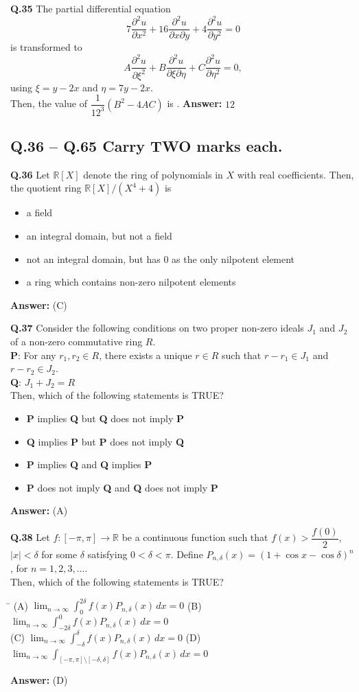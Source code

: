 \documentclass[11pt,a4paper]{article}
\newcommand{\optsfourA}[4]{%
  \begin{tabbing}
    \hspace{0.48\linewidth}\=\kill
    (A) #1 \> (B) #2 \\[2pt]
    (C) #3 \> (D) #4
  \end{tabbing}%
}
\newcommand{\optslistA}[4]{%
  \begin{itemize}
    \setlength{\itemsep}{2pt}\setlength{\parskip}{0pt}
    \item[(A)] #1
    \item[(B)] #2
    \item[(C)] #3
    \item[(D)] #4
  \end{itemize}%
}
\newcommand{\ans}[1]{\textbf{Answer:} #1\par\medskip}
\begin{document}
\textbf{Q.35} The partial differential equation
\[
  7\frac{\partial^2 u}{\partial x^2} + 16\frac{\partial^2 u}{\partial x \partial y} + 4\frac{\partial^2 u}{\partial y^2} = 0
\]
is transformed to
\[
  A\frac{\partial^2 u}{\partial \xi^2} + B\frac{\partial^2 u}{\partial \xi \partial \eta} + C\frac{\partial^2 u}{\partial \eta^2} = 0,
\]
using $\xi = y - 2x$ and $\eta = 7y - 2x$.\\
Then, the value of $\dfrac{1}{12^3}(B^2 - 4AC)$ is \underline{\hspace{2cm}}.
\ans{$12$}

\subsection*{Q.36 -- Q.65 Carry TWO marks each.}

\textbf{Q.36} Let $\mathbb{R}[X]$ denote the ring of polynomials in $X$ with real coefficients. Then, the quotient ring $\mathbb{R}[X] / (X^4 + 4)$ is
\optslistA{a field}{an integral domain, but not a field}{not an integral domain, but has $0$ as the only nilpotent element}{a ring which contains non-zero nilpotent elements}
\ans{(C)}

\textbf{Q.37} Consider the following conditions on two proper non-zero ideals $J_1$ and $J_2$ of a non-zero commutative ring $R$.\\
\textbf{P}: For any $r_1, r_2 \in R$, there exists a unique $r \in R$ such that $r - r_1 \in J_1$ and $r - r_2 \in J_2$.\\
\textbf{Q}: $J_1 + J_2 = R$\\
Then, which of the following statements is TRUE?
\optslistA{\textbf{P} implies \textbf{Q} but \textbf{Q} does not imply \textbf{P}}{\textbf{Q} implies \textbf{P} but \textbf{P} does not imply \textbf{Q}}{\textbf{P} implies \textbf{Q} and \textbf{Q} implies \textbf{P}}{\textbf{P} does not imply \textbf{Q} and \textbf{Q} does not imply \textbf{P}}
\ans{(A)}

\textbf{Q.38} Let $f : [-\pi, \pi] \to \mathbb{R}$ be a continuous function such that $f(x) > \dfrac{f(0)}{2}$, $|x| < \delta$ for some $\delta$ satisfying $0 < \delta < \pi$. Define $P_{n,\delta}(x) = (1 + \cos x - \cos\delta)^n$, for $n = 1, 2, 3, \dots$.\\
Then, which of the following statements is TRUE?
\optsfourA{$\displaystyle\lim_{n\to\infty} \int_0^{2\delta} f(x) P_{n,\delta}(x)\,dx = 0$}{$\displaystyle\lim_{n\to\infty} \int_{-2\delta}^{0} f(x) P_{n,\delta}(x)\,dx = 0$}{$\displaystyle\lim_{n\to\infty} \int_{-\delta}^{\delta} f(x) P_{n,\delta}(x)\,dx = 0$}{$\displaystyle\lim_{n\to\infty} \int_{[-\pi, \pi] \setminus [-\delta, \delta]} f(x) P_{n,\delta}(x)\,dx = 0$}
\ans{(D)}
\end{document}
